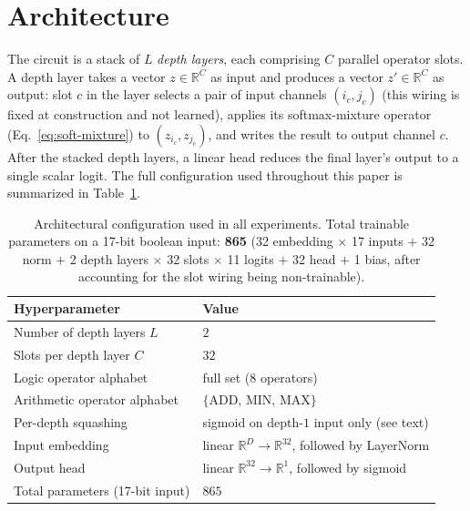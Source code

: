 \documentclass{article}
\newcommand{\R}{\mathbb{R}}
\begin{document}
\section{Architecture}
\label{sec:architecture}

The circuit is a stack of $L$ \emph{depth layers}, each comprising $C$ parallel operator slots.
A depth layer takes a vector $z \in \R^{C}$ as input and produces a vector $z' \in \R^{C}$ as output:
slot $c$ in the layer selects a pair of input channels $(i_c, j_c)$ (this wiring is fixed at construction and not learned), applies its softmax-mixture operator (Eq.~\ref{eq:soft-mixture}) to $(z_{i_c}, z_{j_c})$, and writes the result to output channel $c$.
After the stacked depth layers, a linear head reduces the final layer's output to a single scalar logit.
The full configuration used throughout this paper is summarized in Table~\ref{tab:hyper}.

\begin{table}[H]
\centering
\caption{Architectural configuration used in all experiments. Total trainable parameters on a 17-bit boolean input: \textbf{865} (32 embedding $\times$ 17 inputs $+$ 32 norm $+$ 2 depth layers $\times$ 32 slots $\times$ 11 logits $+$ 32 head $+$ 1 bias, after accounting for the slot wiring being non-trainable).}
\label{tab:hyper}
\begin{tabular}{ll}
\toprule
\textbf{Hyperparameter} & \textbf{Value} \\
\midrule
Number of depth layers $L$              & $2$ \\
Slots per depth layer $C$               & $32$ \\
Logic operator alphabet                 & full set (8 operators) \\
Arithmetic operator alphabet            & $\{\text{ADD},\,\text{MIN},\,\text{MAX}\}$ \\
Per-depth squashing                     & sigmoid on depth-$1$ input only (see text) \\
Input embedding                         & linear $\R^{D} \to \R^{32}$, followed by LayerNorm \\
Output head                             & linear $\R^{32} \to \R^{1}$, followed by sigmoid \\
Total parameters (17-bit input)         & $865$ \\
\bottomrule
\end{tabular}
\end{table}
\end{document}
